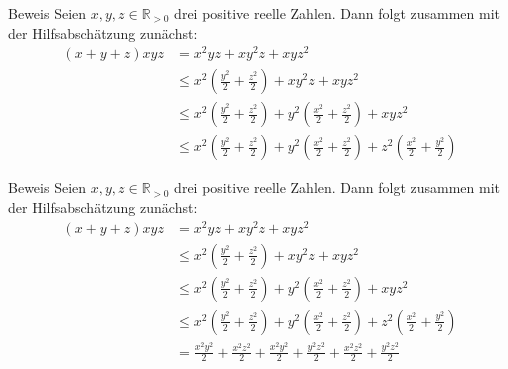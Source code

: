 \documentclass[10pt]{beamer}
\def\bR{\mathbb{R}}
\begin{document}
\begin{frame}{Beweis}
    Seien \( x, y, z \in \bR_{> 0} \) drei positive reelle Zahlen. Dann folgt zusammen mit der Hilfsabschätzung zunächst:
    \begin{align*}
        \left( x + y + z \right)xyz
        & = x^{2}yz + xy^{2}z + xyz^{2} \\
        & \leq x^{2} \left( \frac{y^{2}}{2} + \frac{z^{2}}{2} \right) + xy^{2}z + xyz^{2} \\
        & \leq x^{2} \left( \frac{y^{2}}{2} + \frac{z^{2}}{2} \right) + y^{2} \left( \frac{x^{2}}{2} + \frac{z^{2}}{2} \right) + xyz^{2} \\
        & \leq x^{2} \left( \frac{y^{2}}{2} + \frac{z^{2}}{2} \right) + y^{2} \left( \frac{x^{2}}{2} + \frac{z^{2}}{2} \right) + z^{2} \left( \frac{x^{2}}{2} + \frac{y^{2}}{2} \right)
    \end{align*}
\end{frame}



\begin{frame}{Beweis}
    Seien \( x, y, z \in \bR_{> 0} \) drei positive reelle Zahlen. Dann folgt zusammen mit der Hilfsabschätzung zunächst:
    \begin{align*}
        \left( x + y + z \right)xyz
        & = x^{2}yz + xy^{2}z + xyz^{2} \\
        & \leq x^{2} \left( \frac{y^{2}}{2} + \frac{z^{2}}{2} \right) + xy^{2}z + xyz^{2} \\
        & \leq x^{2} \left( \frac{y^{2}}{2} + \frac{z^{2}}{2} \right) + y^{2} \left( \frac{x^{2}}{2} + \frac{z^{2}}{2} \right) + xyz^{2} \\
        & \leq x^{2} \left( \frac{y^{2}}{2} + \frac{z^{2}}{2} \right) + y^{2} \left( \frac{x^{2}}{2} + \frac{z^{2}}{2} \right) + z^{2} \left( \frac{x^{2}}{2} + \frac{y^{2}}{2} \right) \\
        & = \frac{x^{2}y^{2}}{2} + \frac{x^{2}z^{2}}{2} + \frac{x^{2}y^{2}}{2} + \frac{y^{2}z^{2}}{2} + \frac{x^{2}z^{2}}{2} + \frac{y^{2}z^{2}}{2}
    \end{align*}
\end{frame}
\end{document}
